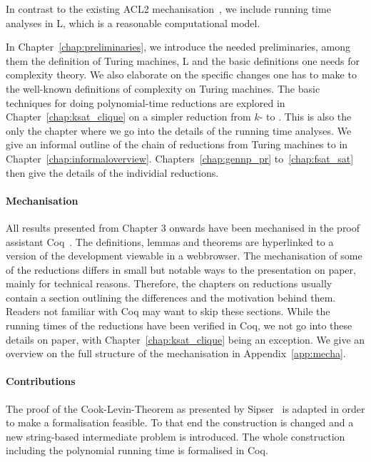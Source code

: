 In contrast to the existing ACL2 mechanisation~\cite{gamboa:cook}, we include running time analyses in L, which is a reasonable computational model.

In Chapter~\ref{chap:preliminaries}, we introduce the needed preliminaries, among them the definition of Turing machines, L and the basic definitions one needs for complexity theory. We also elaborate on the specific changes one has to make to the well-known definitions of complexity on Turing machines.
The basic techniques for doing polynomial-time reductions are explored in Chapter~\ref{chap:ksat_clique} on a simpler reduction from $k$-\SAT{} to \Clique{}. This is also the only the chapter where we go into the details of the running time analyses.
We give an informal outline of the chain of reductions from Turing machines to \SAT{} in Chapter~\ref{chap:informaloverview}. 
Chapters~\ref{chap:gennp_pr} to~\ref{chap:fsat_sat} then give the details of the individial reductions.

\paragraph{Mechanisation}
All results presented from Chapter 3 onwards have been mechanised in the proof assistant Coq~\cite{coqweb}. The definitions, lemmas and theorems are hyperlinked to a version of the development viewable in a webbrowser.
The mechanisation of some of the reductions differs in small but notable ways to the presentation on paper, mainly for technical reasons. 
Therefore, the chapters on reductions usually contain a section outlining the differences and the motivation behind them. 
Readers not familiar with Coq may want to skip these sections.
While the running times of the reductions have been verified in Coq, we not go into these details on paper, with Chapter~\ref{chap:ksat_clique} being an exception.
We give an overview on the full structure of the mechanisation in Appendix~\ref{app:mecha}.

\paragraph{Contributions}
The proof of the Cook-Levin-Theorem as presented by Sipser~\cite{Sipser:TheoryofComputation} is adapted in order to make a formalisation feasible. To that end the construction is changed and a new string-based intermediate problem is introduced. 
The whole construction including the polynomial running time is formalised in Coq.





